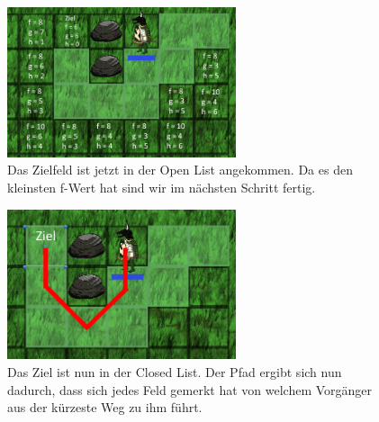 \documentclass[extern,palatino]{cgBA}
\begin{document}
\begin{figure}
	\centering
	\includegraphics[width=0.6\textwidth]{pathfinding4.png}
	\caption{Das Zielfeld ist jetzt in der Open List angekommen. Da es den kleinsten f-Wert hat sind wir im nächsten Schritt fertig.}
	\label{pathfinding4}
\end{figure}
\begin{figure}
	\centering
	\includegraphics[width=0.6\textwidth]{pathfinding5.png}
	\caption{Das Ziel ist nun in der Closed List. Der Pfad ergibt sich nun dadurch, dass sich jedes Feld gemerkt hat von welchem Vorgänger aus der kürzeste Weg zu ihm führt.}
	\label{pathfinding5}
\end{figure}
\newpage
\end{document}

